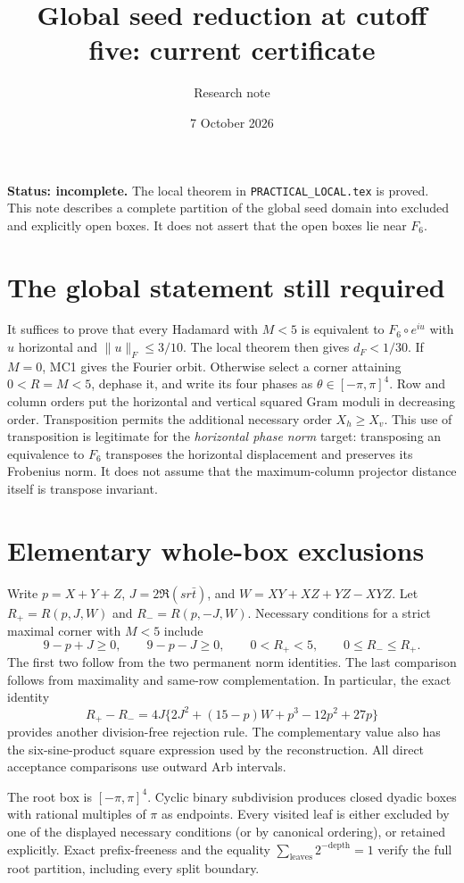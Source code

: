 \documentclass[11pt]{article}
\title{Global seed reduction at cutoff five: current certificate}
\author{Research note}\date{7 October 2026}
\begin{document}
\maketitle
\noindent\textbf{Status: incomplete.} The local theorem in
\texttt{PRACTICAL\_LOCAL.tex} is proved. This note describes a complete
partition of the global seed domain into excluded and explicitly open
boxes. It does not assert that the open boxes lie near $F_6$.

\section*{The global statement still required}
It suffices to prove that every Hadamard with $M<5$ is equivalent to
$F_6\circ e^{iu}$ with $u$ horizontal and $\|u\|_F\le3/10$.
The local theorem then gives $d_F<1/30$.
If $M=0$, MC1 gives the Fourier orbit. Otherwise select a corner attaining
$0<R=M<5$, dephase it, and write its four phases as
$\theta\in[-\pi,\pi]^4$.
Row and column orders put the horizontal and vertical squared Gram
moduli in decreasing order. Transposition permits the additional necessary
order $X_h\ge X_v$. This use of transposition is legitimate for the
\emph{horizontal phase norm} target: transposing an equivalence to $F_6$
transposes the horizontal displacement and preserves its Frobenius norm.
It does not assume that the maximum-column projector distance itself
is transpose invariant.

\section*{Elementary whole-box exclusions}
Write $p=X+Y+Z$, $J=2\Re(s r\bar t)$, and
$W=XY+XZ+YZ-XYZ$. Let $R_+=R(p,J,W)$ and $R_-=R(p,-J,W)$.
Necessary conditions for a strict maximal corner with $M<5$ include
\[
 9-p+J\ge0,\qquad9-p-J\ge0,\qquad
 0<R_+<5,\qquad 0\le R_-\le R_+.
\]
The first two follow from the two permanent norm identities. The last
comparison follows from maximality and same-row complementation.
In particular, the exact identity
\[
 R_+-R_-=4J\{2J^2+(15-p)W+p^3-12p^2+27p\}
\]
provides another division-free rejection rule. The complementary value
also has the six-sine-product square expression used by the reconstruction.
All direct acceptance comparisons use outward Arb intervals.

The root box is $[-\pi,\pi]^4$. Cyclic binary subdivision produces
closed dyadic boxes with rational multiples of $\pi$ as endpoints.
Every visited leaf is either excluded by one of the displayed necessary
conditions (or by canonical ordering), or retained explicitly. Exact
prefix-freeness and the equality $\sum_{\text{leaves}}2^{-\text{depth}}=1$
verify the full root partition, including every split boundary.
\end{document}
